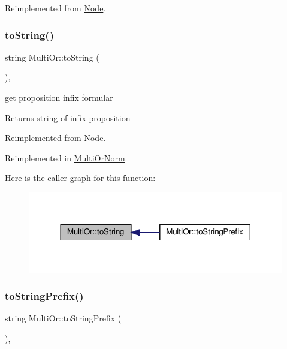 Reimplemented from \hyperlink{class_node_afd0c2045f3955e02e3aa1e2e987f10b2}{Node}.

\mbox{\label{class_multi_or_ade4d5f7db13aca1020dba2396ef00dd7}} 
\subsubsection{\texorpdfstring{to\+String()}{toString()}}
{\footnotesize\ttfamily string Multi\+Or\+::to\+String (\begin{DoxyParamCaption}{ }\end{DoxyParamCaption})\hspace{0.3cm}{\ttfamily [override]}, {\ttfamily [virtual]}}



get proposition infix formular 

\begin{DoxyReturn}{Returns}
string of infix proposition 
\end{DoxyReturn}


Reimplemented from \hyperlink{class_node_a0746502074a232243dcac3b96f3ce2d0}{Node}.



Reimplemented in \hyperlink{class_multi_or_norm_ad70e2ca31478183da21ee1995964c2c3}{Multi\+Or\+Norm}.

Here is the caller graph for this function\+:\nopagebreak
\begin{figure}[H]
\begin{center}
\leavevmode
\includegraphics[width=317pt]{dd/d61/class_multi_or_ade4d5f7db13aca1020dba2396ef00dd7_icgraph}
\end{center}
\end{figure}
\mbox{\label{class_multi_or_a80405614a8a8db0992c35a70f36aa025}} 
\subsubsection{\texorpdfstring{to\+String\+Prefix()}{toStringPrefix()}}
{\footnotesize\ttfamily string Multi\+Or\+::to\+String\+Prefix (\begin{DoxyParamCaption}{ }\end{DoxyParamCaption})\hspace{0.3cm}{\ttfamily [override]}, {\ttfamily [virtual]}}



